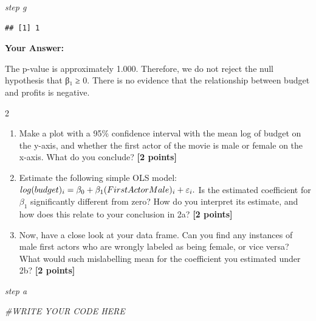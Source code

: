 \documentclass[
]{article}
\newenvironment{Shaded}{\begin{snugshade}}{\end{snugshade}}
\newcommand{\AttributeTok}[1]{\textcolor[rgb]{0.13,0.29,0.53}{#1}}
\newcommand{\CommentTok}[1]{\textcolor[rgb]{0.56,0.35,0.01}{\textit{#1}}}
\newcommand{\ConstantTok}[1]{\textcolor[rgb]{0.56,0.35,0.01}{#1}}
\newcommand{\FunctionTok}[1]{\textcolor[rgb]{0.13,0.29,0.53}{\textbf{#1}}}
\newcommand{\NormalTok}[1]{#1}
\newcommand{\OtherTok}[1]{\textcolor[rgb]{0.56,0.35,0.01}{#1}}
\newcommand{\SpecialCharTok}[1]{\textcolor[rgb]{0.81,0.36,0.00}{\textbf{#1}}}
\newcommand{\StringTok}[1]{\textcolor[rgb]{0.31,0.60,0.02}{#1}}
\providecommand{\tightlist}{%
  \setlength{\itemsep}{0pt}\setlength{\parskip}{0pt}}
\begin{document}
\emph{step g}

\begin{Shaded}
\end{Shaded}

\begin{verbatim}
## [1] 1
\end{verbatim}

\textbf{Your Answer:}

The p-value is approximately 1.000. Therefore, we do not reject the null
hypothesis that β₁ ≥ 0. There is no evidence that the relationship
between budget and profits is negative.

2

\begin{enumerate}
\def\labelenumi{\alph{enumi}.}
\tightlist
\item
  Make a plot with a 95\% confidence interval with the mean log of
  budget on the y-axis, and whether the first actor of the movie is male
  or female on the x-axis. What do you conclude? \textbf{[2 points]}
\item
  Estimate the following simple OLS model:
  \(log(budget)_i=\beta_0+\beta_1 \text(FirstActorMale)_i + \varepsilon_i.\)
  Is the estimated coefficient for \(\beta_1\) significantly different
  from zero? How do you interpret its estimate, and how does this relate
  to your conclusion in 2a? \textbf{[2 points]}
\item
  Now, have a close look at your data frame. Can you find any instances
  of male first actors who are wrongly labeled as being female, or vice
  versa? What would such mislabelling mean for the coefficient you
  estimated under 2b? \textbf{[2 points]}
\end{enumerate}

\emph{step a}

\begin{Shaded}
\begin{Highlighting}[]
\CommentTok{\#WRITE YOUR CODE HERE}
\end{Highlighting}
\end{Shaded}
\end{document}
